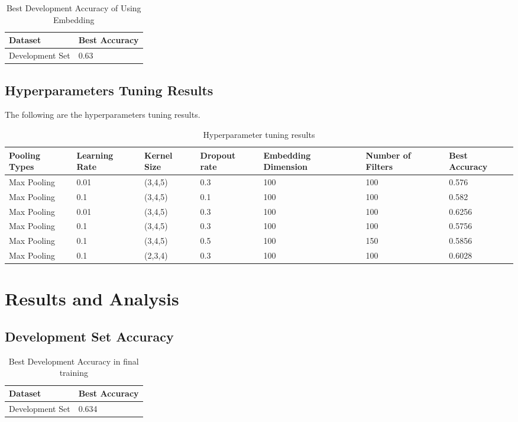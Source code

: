 \documentclass{article}
\begin{document}
\begin{table}[htb]
	\caption{Best Development Accuracy of Using Embedding}
	\label{sample-table}
	\centering
	\begin{tabular}{ll}
		\toprule
		\cmidrule{1-2}
		Dataset & Best Accuracy\\
		\midrule
		Development Set & 0.63   \\
		\bottomrule
	\end{tabular}
\end{table}

\subsection{Hyperparameters Tuning Results}
The following are the hyperparameters tuning results.

\begin{table}[htb]
	\caption{Hyperparameter tuning results}
	\label{sample-table}
	\centering
	\begin{tabular}{lllllll}
		\toprule
		\cmidrule{1-7}
		Pooling Types & Learning Rate & Kernel Size & Dropout rate & Embedding Dimension 	& Number of Filters & Best Accuracy\\
		\midrule
		Max Pooling & 0.01  & (3,4,5) & 0.3 & 100 & 100 & 0.576 \\
		Max Pooling & 0.1  & (3,4,5) & 0.1 & 100 & 100 & 0.582 \\
		Max Pooling & 0.01  & (3,4,5) & 0.3 & 100 & 100 & 0.6256 \\
		Max Pooling & 0.1  & (3,4,5) & 0.3 & 100 & 100 & 0.5756 \\
		Max Pooling & 0.1  & (3,4,5) & 0.5 & 100 & 150 & 0.5856 \\
		Max Pooling & 0.1  & (2,3,4) & 0.3 & 100 & 100 & 0.6028 \\
		\bottomrule
	\end{tabular}
\end{table}

\pagebreak

\section{Results and Analysis}

\subsection{Development Set Accuracy}

\begin{table}[htb]
	\caption{Best Development Accuracy in final training}
	\label{sample-table}
	\centering
	\begin{tabular}{ll}
		\toprule
		\cmidrule{1-2}
		Dataset & Best Accuracy\\
		\midrule
		Development Set & 0.634   \\
		\bottomrule
	\end{tabular}
\end{table}
\end{document}
